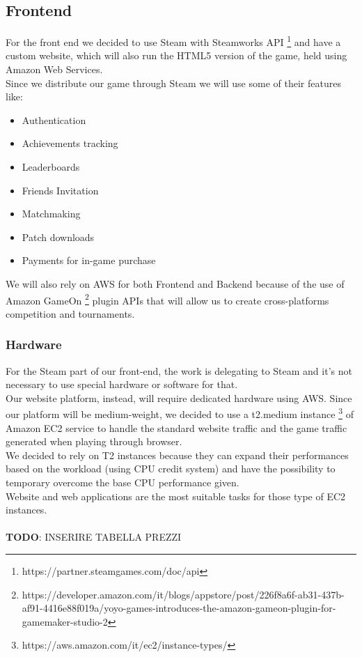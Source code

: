 \subsection{Frontend}
For the front end we decided to use Steam with Steamworks API \footnote{https://partner.steamgames.com/doc/api} and have a custom website, which will also run the HTML5 version of the game, held using Amazon Web Services.\\
Since we distribute our game through Steam we will use some of their features like:
\begin{itemize}
\item Authentication
\item Achievements tracking
\item Leaderboards
\item Friends Invitation
\item Matchmaking
\item Patch downloads
\item Payments for in-game purchase
\end{itemize}
We will also rely on AWS for both Frontend and Backend because of the use of Amazon GameOn \footnote{https://developer.amazon.com/it/blogs/appstore/post/226f8a6f-ab31-437b-af91-4416e88f019a/yoyo-games-introduces-the-amazon-gameon-plugin-for-gamemaker-studio-2} plugin APIs that will allow us to create cross-platforms competition and tournaments.\\
 
\subsubsection{Hardware}
For the Steam part of our front-end, the work is delegating to Steam and it's not necessary to use special hardware or software for that.\\
Our website platform, instead, will require dedicated hardware using AWS. Since our platform will be medium-weight, we decided to use a t2.medium instance \footnote{https://aws.amazon.com/it/ec2/instance-types/} of Amazon EC2 service to handle the standard website traffic and the game traffic generated when playing through browser.\\
We decided to rely on T2 instances because they can expand their performances based on the workload (using CPU credit system) and have the possibility to temporary overcome the base CPU performance given.\\
Website and web applications are the most suitable tasks for those type of EC2 instances.\\
\\
\textbf{TODO}: INSERIRE TABELLA PREZZI
\\
